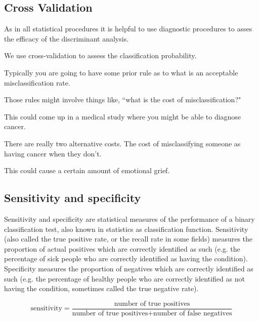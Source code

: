 \documentclass[12pt]{article} %
\begin{document}



\subsection*{Cross Validation}

As in all statistical procedures it is helpful to use diagnostic procedures to asses the efficacy of the discriminant analysis. 

We use cross-validation to assess the classification probability. 

Typically you are going to have some prior rule as to what is an acceptable misclassification rate. 

Those rules might involve things like, ``what is the cost of misclassification?" 

This could come up in a medical study where you might be able to diagnose cancer. 

There are really two alternative costs. The cost of misclassifying someone as having cancer when they don't. 

This could cause a certain amount of emotional grief.


\subsection*{Sensitivity and specificity}

Sensitivity and specificity are statistical measures of the performance of a binary classification test, also known in statistics as classification function. Sensitivity (also called the true positive rate, or the recall rate in some fields) measures the proportion of actual positives which are correctly identified as such (e.g. the percentage of sick people who are correctly identified as having the condition). Specificity measures the proportion of negatives which are correctly identified as such (e.g. the percentage of healthy people who are correctly identified as not having the condition, sometimes called the true negative rate). 

\[ \mbox{sensitivity} = \frac{ \mbox{number of true positives} } {\mbox{number of true positives} + \mbox{number of false negatives}} \]
\end{document}
